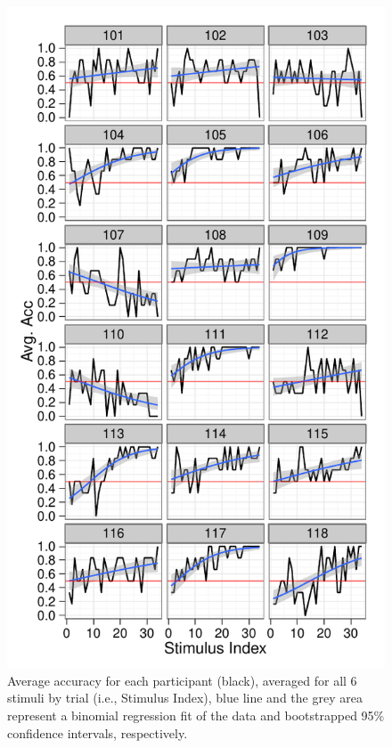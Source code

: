 \begin{figure}[tp]
    \includegraphics{f_all_sS_acc}
    \centering
    \caption{Average accuracy for each participant (black), averaged for all 6 stimuli by trial (i.e., Stimulus Index), blue line and the grey area represent a binomial regression fit of the data and bootstrapped 95\% confidence intervals, respectively.}
    \label{fig:sacc}
\end{figure}

